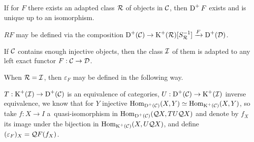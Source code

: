 	\begin{theorem}
		If for $F$ there exists an adapted class ${\mathcal{R}}$ of objects in $\mathcal{C}$, 
		then $\operatorname{D}^+ F$ exists and is unique up to an isomorphism.
	\end{theorem}
	
	\begin{theorem}
		$RF$ may be defined via the composition
		$\operatorname{D}^+(\mathcal{C}) \to \operatorname{K}^+({\mathcal{R}})[S_{{\mathcal{R}}}^{-1}] \xrightarrow{F} \operatorname{D}^+(\mathcal{D})$.
	\end{theorem}
	
	\begin{theorem}
		If $\mathcal{C}$ contains enough injective objects,
		then the class ${\mathcal{I}}$ of them is adapted to 
		any left exact functor $F:\mathcal{C} \to \mathcal{D}$.
	\end{theorem}
	
	\begin{proposition}
		When ${\mathcal{R}} = {\mathcal{I}}$, then $\varepsilon_F$ may be defined
		in the following way.
		
		$T:\operatorname{K}^+({\mathcal{I}}) \to \operatorname{D}^+(\mathcal{C})$ is an equivalence of categories,
		$U:\operatorname{D}^+(\mathcal{C}) \to \operatorname{K}^+({\mathcal{I}})$ inverse equivalence,
		we know that for $Y$ injective $\operatorname{Hom}_{\operatorname{D}^+(\mathcal{C})}(X,Y) \simeq \operatorname{Hom}_{\operatorname{K}^+(\mathcal{C})}(X,Y)$,
		so take $f:X \to I$ a~quasi-isomorphism in $\operatorname{Hom}_{\operatorname{D}^+(\mathcal{C})} (\mathcal{Q} X, TU \mathcal{Q} X)$
		and denote by $f_X$ its image under the bijection
		in $\operatorname{Hom}_{\operatorname{K}^+(\mathcal{C})}(X, U\mathcal{Q} X)$,
		and define $(\varepsilon_F)_X = \mathcal{Q} F(f_X)$.
	\end{proposition}



 
 
